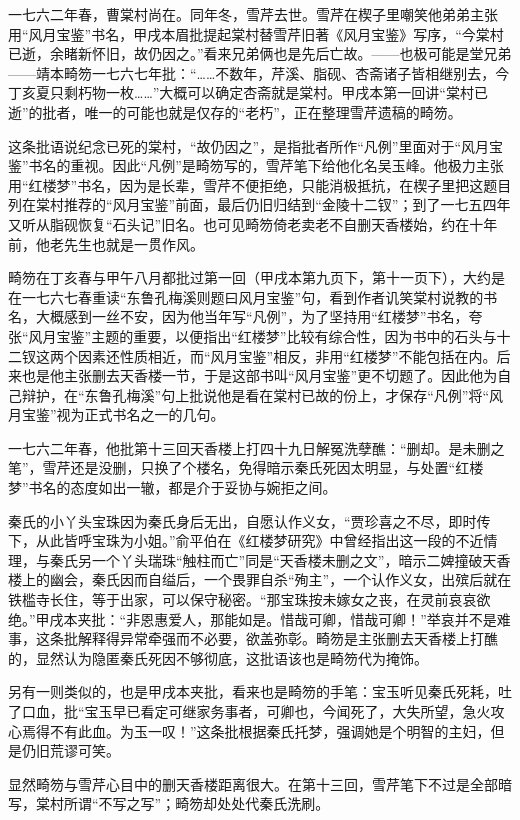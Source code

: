 \par 一七六二年春，曹棠村尚在。同年冬，雪芹去世。雪芹在楔子里嘲笑他弟弟主张用“风月宝鉴”书名，甲戌本眉批提起棠村替雪芹旧著《风月宝鉴》写序，“今棠村已逝，余睹新怀旧，故仍因之。”看来兄弟俩也是先后亡故。——也极可能是堂兄弟——靖本畸笏一七六七年批：“……不数年，芹溪、脂砚、杏斋诸子皆相继别去，今丁亥夏只剩朽物一枚……”大概可以确定杏斋就是棠村。甲戌本第一回讲“棠村已逝”的批者，唯一的可能也就是仅存的“老朽”，正在整理雪芹遗稿的畸笏。
\par 这条批语说纪念已死的棠村，“故仍因之”，是指批者所作“凡例”里面对于“风月宝鉴”书名的重视。因此“凡例”是畸笏写的，雪芹笔下给他化名吴玉峰。他极力主张用“红楼梦”书名，因为是长辈，雪芹不便拒绝，只能消极抵抗，在楔子里把这题目列在棠村推荐的“风月宝鉴”前面，最后仍旧归结到“金陵十二钗”；到了一七五四年又听从脂砚恢复“石头记”旧名。也可见畸笏倚老卖老不自删天香楼始，约在十年前，他老先生也就是一贯作风。
\par 畸笏在丁亥春与甲午八月都批过第一回（甲戌本第九页下，第十一页下），大约是在一七六七春重读“东鲁孔梅溪则题曰风月宝鉴”句，看到作者讥笑棠村说教的书名，大概感到一丝不安，因为他当年写“凡例”，为了坚持用“红楼梦”书名，夸张“风月宝鉴”主题的重要，以便指出“红楼梦”比较有综合性，因为书中的石头与十二钗这两个因素还性质相近，而“风月宝鉴”相反，非用“红楼梦”不能包括在内。后来也是他主张删去天香楼一节，于是这部书叫“风月宝鉴”更不切题了。因此他为自己辩护，在“东鲁孔梅溪”句上批说他是看在棠村已故的份上，才保存“凡例”将“风月宝鉴”视为正式书名之一的几句。
\par 一七六二年春，他批第十三回天香楼上打四十九日解冤洗孽醮：“删却。是未删之笔”，雪芹还是没删，只换了个楼名，免得暗示秦氏死因太明显，与处置“红楼梦”书名的态度如出一辙，都是介于妥协与婉拒之间。
\par 秦氏的小丫头宝珠因为秦氏身后无出，自愿认作义女，“贾珍喜之不尽，即时传下，从此皆呼宝珠为小姐。”俞平伯在《红楼梦研究》中曾经指出这一段的不近情理，与秦氏另一个丫头瑞珠“触柱而亡”同是“天香楼未删之文”，暗示二婢撞破天香楼上的幽会，秦氏因而自缢后，一个畏罪自杀“殉主”，一个认作义女，出殡后就在铁槛寺长住，等于出家，可以保守秘密。“那宝珠按未嫁女之丧，在灵前哀哀欲绝。”甲戌本夹批：“非恩惠爱人，那能如是。惜哉可卿，惜哉可卿！”举哀并不是难事，这条批解释得异常牵强而不必要，欲盖弥彰。畸笏是主张删去天香楼上打醮的，显然认为隐匿秦氏死因不够彻底，这批语该也是畸笏代为掩饰。
\par 另有一则类似的，也是甲戌本夹批，看来也是畸笏的手笔：宝玉听见秦氏死耗，吐了口血，批“宝玉早已看定可继家务事者，可卿也，今闻死了，大失所望，急火攻心焉得不有此血。为玉一叹！”这条批根据秦氏托梦，强调她是个明智的主妇，但是仍旧荒谬可笑。
\par 显然畸笏与雪芹心目中的删天香楼距离很大。在第十三回，雪芹笔下不过是全部暗写，棠村所谓“不写之写”；畸笏却处处代秦氏洗刷。
